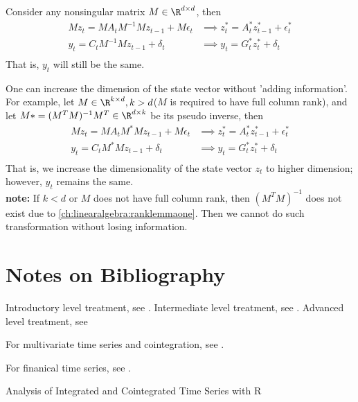 \begin{remark}
Consider any nonsingular matrix $M\in \R^{d\times d}$, then
\begin{align*}
Mz_t = MA_tM^{-1}Mz_{t-1} + M\epsilon_t &\implies z_t^* = A_t^* z_{t-1}^* + \epsilon_t^*\\
y_t = C_tM^{-1}Mz_{t-1} + \delta_t &\implies y_t = G_t^* z_{t}^* + \delta_t\\
\end{align*}
That is, $y_t$ will still be the same.
\end{remark}

\begin{remark}
One can increase the dimension of the state vector without 'adding information'. For example, let $M\in \R^{k\times d},k>d$($M$ is required to have full column rank), and let $M* = (M^TM)^{-1}M^T \in \R^{d\times k}$ be its pseudo inverse, then
 \begin{align*}
 Mz_t = MA_tM^*Mz_{t-1} + M\epsilon_t &\implies z_t^* = A_t^* z_{t-1}^* + \epsilon_t^*\\
 y_t = C_tM^*Mz_{t-1} + \delta_t &\implies y_t = G_t^* z_{t}^* + \delta_t\\
 \end{align*}
That is, we increase the dimensionality of the state vector $z_t$ to higher dimension; however, $y_t$ remains the same.\\
\textbf{note:}
If $k<d$ or $M$ does not have full column rank, then 
$(M^TM)^{-1}$ does not exist due to \autoref{ch:linearalgebra:ranklemmaone}. Then we cannot do such transformation without losing information.
\end{remark}


\section{Notes on Bibliography}


Introductory level treatment, see \cite{chatfield2003analysis}.
Intermediate level treatment, see \cite{brockwell2002introduction}\cite{hamilton1994time}\cite{shumway2010time}.
Advanced level treatment, see \cite{brockwell1991time}


For multivariate time series and cointegration, see \cite{tsay2013multivariate}\cite{pfaff2008analysis}\cite{lutkepohl2005new}.

For finanical time series, see \cite{tsay2005analysis}\cite{tsay2013multivariate}\cite{hayashi2000econometrics}.


Analysis of Integrated and Cointegrated Time Series with R


\printbibliography